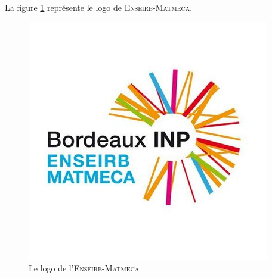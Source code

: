 \documentclass[a4paper]{report}
\begin{document}
\begin{large}
La figure \ref{figure 1} représente le logo de \textsc{Enseirb-Matmeca}.

\begin{figure}[h]
  \centering
  \includegraphics[scale=0.6]{enseirb-matmeca}
  \caption{Le logo de l'\textsc{Enseirb-Matmeca}}
  \label{figure 1}
\end{figure}
\end{large}
\end{document}
